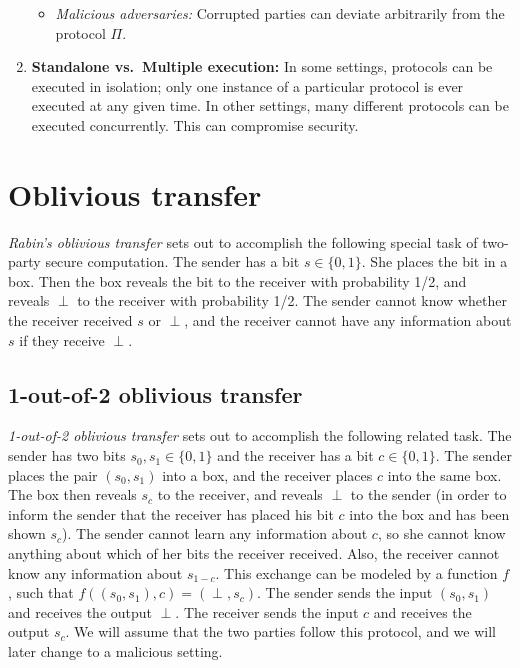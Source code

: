 \begin{enumerate}
\begin{itemize}
      \item \emph{Malicious adversaries:} Corrupted parties can deviate arbitrarily
        from the protocol $\Pi$.
    \end{itemize}

  \item \textbf{Standalone vs.\ Multiple execution:} In some settings, protocols
    can be executed in isolation; only one instance of a particular protocol
    is ever executed at any given time. In other settings, many different protocols
    can be executed concurrently. This can compromise security.
\end{enumerate}







\section{Oblivious transfer}

\emph{Rabin's oblivious transfer} sets out to accomplish the following special task of two-party secure computation. The sender has a bit $s \in \{0,1\}$. She places the bit in a box. Then the box reveals the bit to the receiver with probability 1/2, and reveals $\perp$ to the receiver with probability 1/2. The sender cannot know whether the receiver received $s$ or $\perp$, and the receiver cannot have any information about $s$ if they receive $\perp$.

\subsection{1-out-of-2 oblivious transfer}
\emph{1-out-of-2 oblivious transfer} sets out to accomplish the following related task. The sender has two bits $s_0, s_1 \in \{0,1\}$ and the receiver has a bit $c \in \{0,1\}$. The sender places the pair $(s_0, s_1)$ into a box, and the receiver places $c$ into the same box. The box then reveals $s_c$ to the receiver, and reveals $\perp$ to the sender (in order to inform the sender that the receiver has placed his bit $c$ into the box and has been shown $s_c$). The sender cannot learn any information about $c$, so she cannot know anything about which of her bits the receiver received. Also, the receiver cannot know any information about $s_{1-c}$. This exchange can be modeled by a function $f$, such that $f((s_0, s_1), c) = (\perp, s_c)$. The sender sends the input $(s_0, s_1)$ and receives the output $\perp$. The receiver sends the input $c$ and receives the output $s_c$. We will assume that the two parties follow this protocol, and we will later change to a malicious setting.

